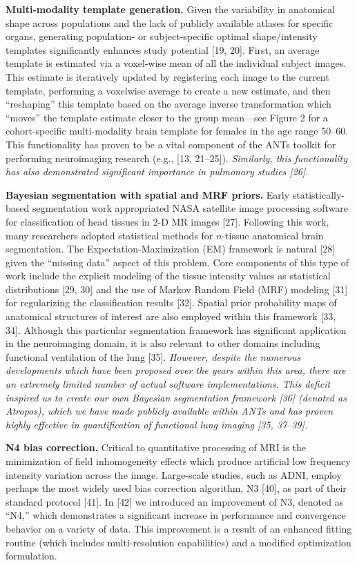 \documentclass[11pt,]{article}
\begin{document}
\textbf{Multi-modality template generation.} Given the variability in
anatomical shape across populations and the lack of publicly available
atlases for specific organs, generating population- or subject-specific
optimal shape/intensity templates significantly enhances study potential
{[}19, 20{]}. First, an average template is estimated via a voxel-wise
mean of all the individual subject images. This estimate is iteratively
updated by registering each image to the current template, performing a
voxelwise average to create a new estimate, and then ``reshaping'' this
template based on the average inverse transformation which ``moves'' the
template estimate closer to the group mean---see Figure 2 for a
cohort-specific multi-modality brain template for females in the age
range 50--60. This functionality has proven to be a vital component of
the ANTs toolkit for performing neuroimaging research (e.g., {[}13,
21--25{]}). \emph{Similarly, this functionality has also demonstrated
significant importance in pulmonary studies {[}26{]}.}

\textbf{Bayesian segmentation with spatial and MRF priors.} Early
statistically-based segmentation work appropriated NASA satellite image
processing software for classification of head tissues in 2-D MR images
{[}27{]}. Following this work, many researchers adopted statistical
methods for \(n\)-tissue anatomical brain segmentation. The
Expectation-Maximization (EM) framework is natural {[}28{]} given the
``missing data'' aspect of this problem. Core components of this type of
work include the explicit modeling of the tissue intensity values as
statistical distributions {[}29, 30{]} and the use of Markov Random
Field (MRF) modeling {[}31{]} for regularizing the classification
results {[}32{]}. Spatial prior probability maps of anatomical
structures of interest are also employed within this framework {[}33,
34{]}. Although this particular segmentation framework has significant
application in the neuroimaging domain, it is also relevant to other
domains including functional ventilation of the lung {[}35{]}.
\emph{However, despite the numerous developments which have been
proposed over the years within this area, there are an extremely limited
number of actual software implementations. This deficit inspired us to
create our own Bayesian segmentation framework {[}36{]} (denoted as
Atropos), which we have made publicly available within ANTs and has
proven highly effective in quantification of functional lung imaging
{[}35, 37--39{]}.}

\textbf{N4 bias correction.} Critical to quantitative processing of MRI
is the minimization of field inhomogeneity effects which produce
artificial low frequency intensity variation across the image.
Large-scale studies, such as ADNI, employ perhaps the most widely used
bias correction algorithm, N3 {[}40{]}, as part of their standard
protocol {[}41{]}. In {[}42{]} we introduced an improvement of N3,
denoted as ``N4,'' which demonstrates a significant increase in
performance and convergence behavior on a variety of data. This
improvement is a result of an enhanced fitting routine (which includes
multi-resolution capabilities) and a modified optimization formulation.
\end{document}
